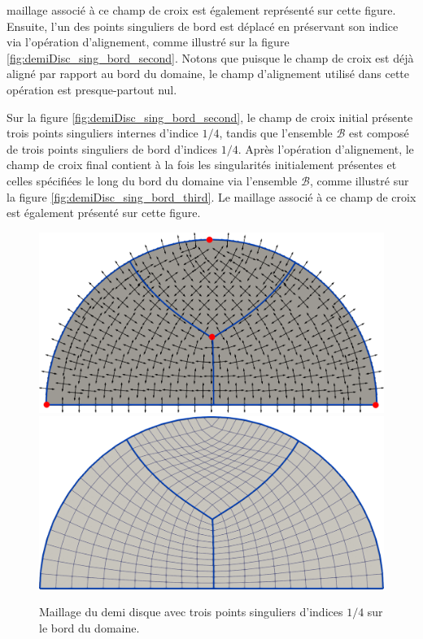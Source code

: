 maillage associé à ce champ de croix est également représenté sur cette figure. Ensuite, l'un des points singuliers de bord est déplacé en préservant son indice via l'opération d'alignement, comme illustré sur la figure \ref{fig:demiDisc_sing_bord_second}. Notons que puisque le champ de croix est déjà aligné par rapport au bord du domaine, le champ d'alignement utilisé dans cette opération est presque-partout nul.

Sur la figure \ref{fig:demiDisc_sing_bord_second}, le champ de croix initial présente trois points singuliers internes d'indice $1/4$, tandis que l'ensemble $\mathcal{B}$ est composé de trois points singuliers de bord d'indices $1/4$. Après l'opération d'alignement, le champ de croix final contient à la fois les singularités initialement présentes et celles spécifiées le long du bord du domaine via l'ensemble $\mathcal{B}$, comme illustré sur la figure \ref{fig:demiDisc_sing_bord_third}. Le maillage associé à ce champ de croix est également présenté sur cette figure.


\begin{figure}[!h]
\centering
\includegraphics[scale=0.24]{images/yo_1.pdf}\\[0.5cm]
\includegraphics[scale=0.24]{images/yo_2.pdf}
\caption{Maillage du demi disque avec trois points singuliers d'indices $1/4$ sur le bord du domaine.}
\label{fig:demiDisc_sing_bord_first}
\end{figure}

